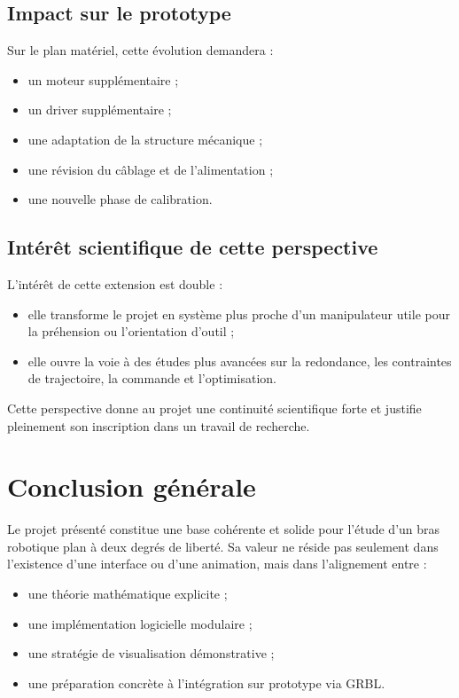 \documentclass[12pt,a4paper]{report}
\begin{document}
\section{Impact sur le prototype}

Sur le plan matériel, cette évolution demandera :

\begin{itemize}
    \item un moteur supplémentaire ;
    \item un driver supplémentaire ;
    \item une adaptation de la structure mécanique ;
    \item une révision du câblage et de l'alimentation ;
    \item une nouvelle phase de calibration.
\end{itemize}

\section{Intérêt scientifique de cette perspective}

L'intérêt de cette extension est double :

\begin{itemize}
    \item elle transforme le projet en système plus proche d'un manipulateur utile pour la préhension ou l'orientation d'outil ;
    \item elle ouvre la voie à des études plus avancées sur la redondance, les contraintes de trajectoire, la commande et l'optimisation.
\end{itemize}

Cette perspective donne au projet une continuité scientifique forte et justifie
pleinement son inscription dans un travail de recherche.

\chapter{Conclusion générale}

Le projet présenté constitue une base cohérente et solide pour l'étude d'un bras
robotique plan à deux degrés de liberté. Sa valeur ne réside pas seulement dans
l'existence d'une interface ou d'une animation, mais dans l'alignement entre :

\begin{itemize}
    \item une théorie mathématique explicite ;
    \item une implémentation logicielle modulaire ;
    \item une stratégie de visualisation démonstrative ;
    \item une préparation concrète à l'intégration sur prototype via GRBL.
\end{itemize}
\end{document}
